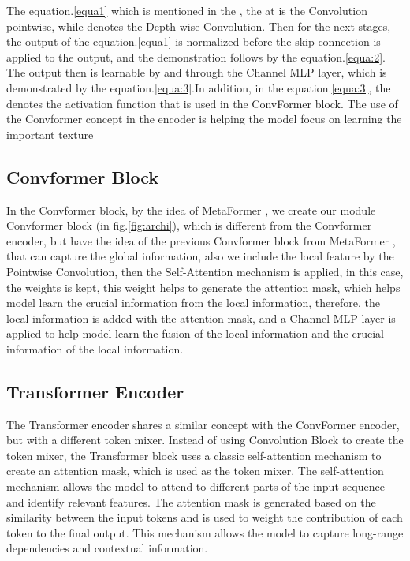 \documentclass[conference]{IEEEtran}
\begin{document}
The equation.\ref{equa1} which is mentioned in the \cite{metaformer}, the  at  is the Convolution pointwise, while  denotes the Depth-wise Convolution. Then for the next stages, the output of the equation.\ref{equa1} is normalized before the skip connection is applied to the output, and the demonstration follows by the equation.\ref{equa:2}. The output then is learnable by  and  through the Channel MLP layer, which is demonstrated by the equation.\ref{equa:3}.In addition, in the equation.\ref{equa:3}, the  denotes the activation function that is used in the ConvFormer block. The use of the Convformer concept in the encoder is helping the model focus on learning the important texture 

\subsection{Convformer Block}
In the Convformer block, by the idea of MetaFormer \cite{metaformer}, we create our module Convformer block (in fig.\ref{fig:archi}), which is different from the Convformer encoder, but have the idea of the previous Convformer block from MetaFormer \cite{metaformer}, that can capture the global information, also we include the local feature by the Pointwise Convolution, then the Self-Attention mechanism \cite{self-attention} is applied, in this case, the weights  is kept, this weight helps to generate the attention mask, which helps model learn the crucial information from the local information, therefore, the local information is added with the attention mask, and a Channel MLP layer is applied to help model learn the fusion of the local information and the crucial information of the local information.

\subsection{Transformer Encoder}
 The Transformer encoder shares a similar concept with the ConvFormer encoder, but with a different token mixer. Instead of using Convolution Block to create the token mixer, the Transformer block uses a classic self-attention mechanism to create an attention mask, which is used as the token mixer. The self-attention mechanism allows the model to attend to different parts of the input sequence and identify relevant features. The attention mask is generated based on the similarity between the input tokens and is used to weight the contribution of each token to the final output. This mechanism allows the model to capture long-range dependencies and contextual information.
\end{document}
